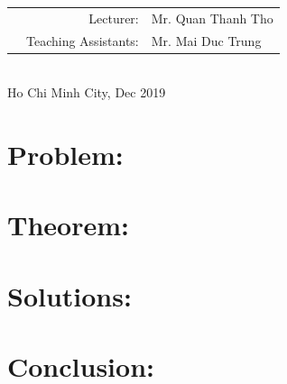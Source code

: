 \documentclass[a4paper]{article}
\begin{document}
\begin{titlepage}
\vspace{0.5cm}

\begin{table}[h]
\begin{tabular}{rrl}
\hspace{7 cm} &Lecturer: & Mr. Quan Thanh Tho\\
& Teaching Assistants: & Mr. Mai Duc Trung \\
\end{tabular}
\end{table}

\begin{center}\\[1.5cm]
{\footnotesize Ho Chi Minh City, Dec 2019}
\end{center}
\end{titlepage}


\newpage
\renewcommand*\contentsname{Outline}
\tableofcontents
\newpage




\section{Problem: }


\section{Theorem: }


\section{Solutions: }



\section{Conclusion: }



\end{document}
